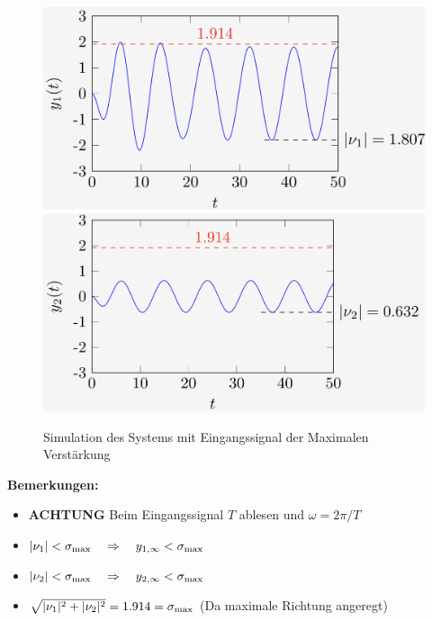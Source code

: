         \begin{figure}[H]
            \centering
            \includegraphics[width = 0.4\linewidth]{images/07/freq_resp_bsp_1.jpeg}
            \includegraphics[width = 0.4\linewidth]{images/07/freq_resp_bsp_2.jpeg}
            \caption{Simulation des Systems mit Eingangssignal der Maximalen Verstärkung}
        \end{figure}
        
        \textbf{Bemerkungen:}
        \begin{itemize}
            \item \textbf{ACHTUNG} Beim Eingangssignal $T$ ablesen und $\omega = 2\pi/T$
            \item $|\nu_1| < \sigma_\textnormal{max} \quad\Rightarrow\quad y_{1,\infty} < \sigma_\textnormal{max}$
            \item $|\nu_2| < \sigma_\textnormal{max} \quad\Rightarrow\quad y_{2,\infty} < \sigma_\textnormal{max}$
            \item $\sqrt{|\nu_1|^2 + |\nu_2|^2} = 1.914 = \sigma_\textnormal{max}$ (Da maximale Richtung angeregt)
        \end{itemize}